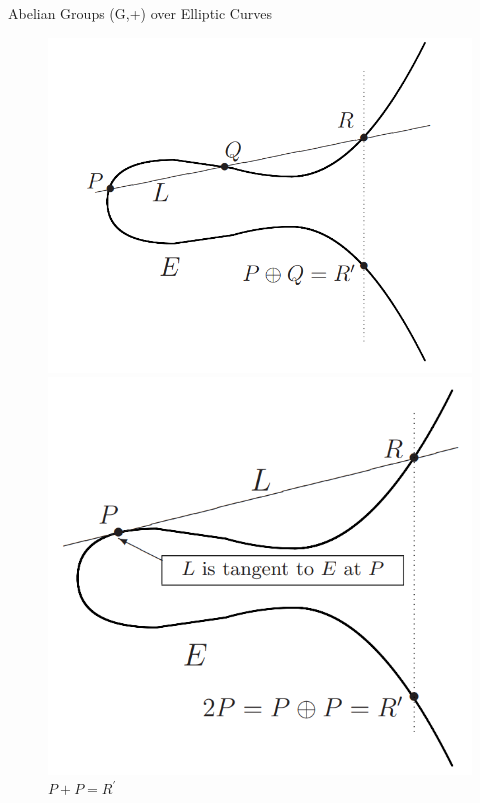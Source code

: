 \documentclass[handout]{beamer}
\begin{document}
\begin{frame}{Abelian Groups (G,+) over Elliptic Curves}
\begin{figure}
	\begin{minipage}{0.5\textwidth}
		\centering
		\includegraphics[width=1\linewidth]{P+Q}
		\caption{$P+Q=R^{\prime}$}\label{fig:p+q}
	\end{minipage}\hfill
	\begin{minipage}{0.48\textwidth}
		\centering
		\includegraphics[width=1\linewidth]{P+P}
		\caption{$P+P=R^{\prime}$}\label{fig:p+p}
	\end{minipage}
\end{figure}

\end{frame}
\end{document}
